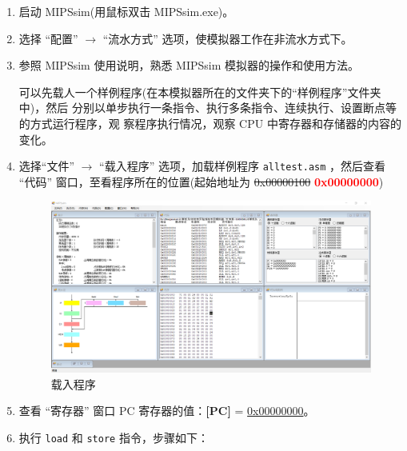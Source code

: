 \documentclass[blue,normal,cn]{elegantnote}
\newcommand{\code}[1]{\colorbox{light-gray}{\texttt{#1}}}
\begin{document}
\begin{enumerate}[wide=0pt, listparindent=2em, parsep=0pt]
    \item 启动 MIPSsim(用鼠标双击 MIPSsim.exe)。
    \item 选择 “配置” $\rightarrow$ “流水方式” 选项，使模拟器工作在非流水方式下。
    \item 参照 MIPSsim 使用说明，熟悉 MIPSsim 模拟器的操作和使用方法。

          可以先载人一个样例程序(在本模拟器所在的文件夹下的“样例程序”文件夹中)，然后
          分别以单步执行一条指令、执行多条指令、连续执行、设置断点等的方式运行程序，观
          察程序执行情况，观察 CPU 中寄存器和存储器的内容的变化。
    \item 选择“文件” $\rightarrow$ “载入程序” 选项，加载样例程序 \code{alltest.asm} ，然后查看 “代码” 窗口，至看程序所在的位置(起始地址为 \sout{0x00000100} \textcolor{red}{\textbf{0x00000000}})

          \begin{figure}[H]
              \centering
              \includegraphics[width=1\textwidth]{fig/load_alltest.png}
              \caption{载入程序}
              \label{fig:load_alltest}
          \end{figure}

    \item 查看 “寄存器” 窗口 PC 寄存器的值：\textbf{[PC]} = \uline{0x00000000}。
    \item 执行 \code{load} 和 \code{store} 指令，步骤如下：


\end{enumerate}
\end{document}
